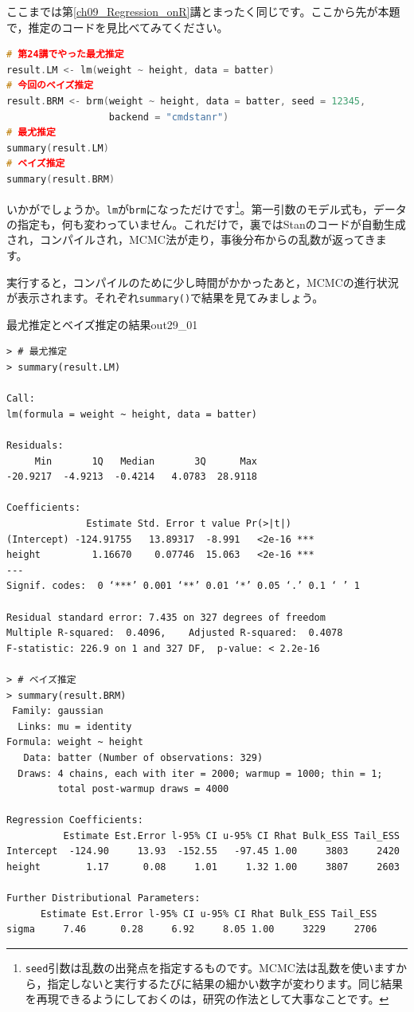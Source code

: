 \documentclass{ltjbook}
\begin{document}
ここまでは第\ref{ch09_Regression_onR}講とまったく同じです。ここから先が本題で，推定のコードを見比べてみてください。

\begin{lstlisting}[language=c++,label={code:29_02},caption={最尤推定とベイズ推定を並べてみる}]
# 第24講でやった最尤推定
result.LM <- lm(weight ~ height, data = batter)
# 今回のベイズ推定
result.BRM <- brm(weight ~ height, data = batter, seed = 12345,
                  backend = "cmdstanr")
# 最尤推定
summary(result.LM)
# ベイズ推定
summary(result.BRM)
\end{lstlisting}

いかがでしょうか。\verb|lm|が\verb|brm|になっただけです\footnote{\texttt{seed}引数は乱数の出発点を指定するものです。MCMC法は乱数を使いますから，指定しないと実行するたびに結果の細かい数字が変わります。同じ結果を再現できるようにしておくのは，研究の作法として大事なことです。}。第一引数のモデル式も，データの指定も，何も変わっていません。これだけで，裏ではStanのコードが自動生成され，コンパイルされ，MCMC法が走り，事後分布からの乱数が返ってきます。

実行すると，コンパイルのために少し時間がかかったあと，MCMCの進行状況が表示されます。それぞれ\verb|summary()|で結果を見てみましょう。

\begin{Rscreen}{最尤推定とベイズ推定の結果}{out29_01}
	\begin{verbatim}
> # 最尤推定
> summary(result.LM)

Call:
lm(formula = weight ~ height, data = batter)

Residuals:
     Min       1Q   Median       3Q      Max 
-20.9217  -4.9213  -0.4214   4.0783  28.9118 

Coefficients:
              Estimate Std. Error t value Pr(>|t|)    
(Intercept) -124.91755   13.89317  -8.991   <2e-16 ***
height         1.16670    0.07746  15.063   <2e-16 ***
---
Signif. codes:  0 ‘***’ 0.001 ‘**’ 0.01 ‘*’ 0.05 ‘.’ 0.1 ‘ ’ 1

Residual standard error: 7.435 on 327 degrees of freedom
Multiple R-squared:  0.4096,	Adjusted R-squared:  0.4078 
F-statistic: 226.9 on 1 and 327 DF,  p-value: < 2.2e-16

> # ベイズ推定
> summary(result.BRM)
 Family: gaussian
  Links: mu = identity
Formula: weight ~ height
   Data: batter (Number of observations: 329)
  Draws: 4 chains, each with iter = 2000; warmup = 1000; thin = 1;
         total post-warmup draws = 4000

Regression Coefficients:
          Estimate Est.Error l-95% CI u-95% CI Rhat Bulk_ESS Tail_ESS
Intercept  -124.90     13.93  -152.55   -97.45 1.00     3803     2420
height        1.17      0.08     1.01     1.32 1.00     3807     2603

Further Distributional Parameters:
      Estimate Est.Error l-95% CI u-95% CI Rhat Bulk_ESS Tail_ESS
sigma     7.46      0.28     6.92     8.05 1.00     3229     2706
	\end{verbatim}
\end{Rscreen}
\end{document}
